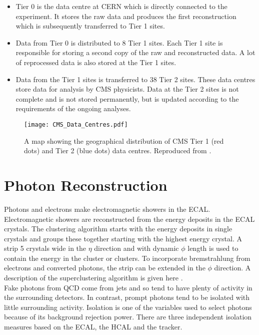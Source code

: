 \begin{itemize}
\item Tier 0 is the data centre at CERN which is directly connected to the
experiment. It stores the raw data and produces the first reconstruction which
is subsequently transferred to Tier 1 sites. 
\item Data from Tier 0 is distributed to 8 Tier 1 sites. Each Tier 1 site is 
responsible for storing a second copy of the raw and reconstructed data. A lot 
of reprocessed data is also stored at the Tier 1 sites. 
\item Data from the Tier 1 sites is transferred to 38 Tier 2 sites. These data
centres store data for analysis by CMS physicists. Data at the Tier 2 sites is
not complete and is not stored permanently, but is updated according to the
requirements of the ongoing analyses.
\end{itemize}

\begin{figure}
\texttt{[image: CMS\_Data\_Centres.pdf]}
\caption{A map showing the geographical distribution of CMS Tier 1 (red dots)
and Tier 2 (blue dots) data centres. Reproduced from \cite{grid}.}
\label{fig:CMS_Data_Centres}
\end{figure}

\section{Photon Reconstruction}
\label{sec:photon_recontruction}

Photons and electrons make electromagnetic showers in the ECAL. Electromagnetic 
showers are reconstructed from the energy deposits in the ECAL crystals. The 
clustering algorithm starts with the energy deposits in single crystals and 
groups these together starting with the highest energy crystal. A strip 5 
crystals wide in the $\eta$ direction and with dynamic $\phi$ length is used to 
contain the energy in the cluster or clusters. To incorporate bremstrahlung from 
electrons and converted photons, the strip can be extended in the $\phi$ 
direction. A description of the superclustering algorithm is given here 
\cite{supercluster}. \\ 

Fake photons from QCD come from jets and so tend to have plenty of activity in
the surrounding detectors. In contrast, prompt photons tend to be isolated with
little surrounding activity. Isolation is one of the variables used to select 
photons because of its background rejection power. There are three independent 
isolation measures based on the ECAL, the HCAL and the tracker. \\


